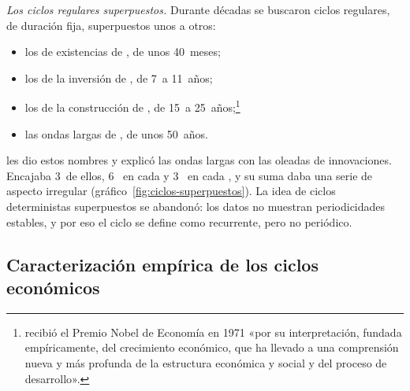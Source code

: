 \documentclass[11pt]{article}
\begin{document}
\begin{anotaciones}
\emph{Los ciclos regulares superpuestos.} Durante décadas se buscaron ciclos regulares, de duración fija, superpuestos unos a otros:
\begin{itemize}
\item los de existencias de \textcite{Kitchin1923Cycles}, de unos 40~meses;
\item los de la inversión de \textcite{Juglar1862Crises}, de 7~a 11~años;
\item los de la construcción de \textcite{Kuznets1930Secular}, de 15~a 25~años;\footnote{ recibió el Premio Nobel de Economía en 1971 «por su interpretación, fundada empíricamente, del crecimiento económico, que ha llevado a una comprensión nueva y más profunda de la estructura económica y social y del proceso de desarrollo»\nocite{Nobel1971Kuznets}.}
\item las ondas largas de \textcite{Kondratieff1935Long}, de unos 50~años.
\end{itemize}
\textcite{Schumpeter1939Business} les dio estos nombres y explicó las ondas largas con las oleadas de innovaciones. Encajaba 3~de ellos, 6~ en cada  y 3~ en cada , y su suma daba una serie de aspecto irregular (gráfico~\ref{fig:ciclos-superpuestos}). La idea de ciclos deterministas superpuestos se abandonó: los datos no muestran periodicidades estables, y por eso el ciclo se define como recurrente, pero no periódico.
\begin{figuracaja}
\caption{Los ciclos regulares superpuestos: las 4~ondas y el esquema de }\label{fig:ciclos-superpuestos}
\end{figuracaja}
\end{anotaciones}

\subsection{Caracterización empírica de los ciclos económicos}\label{sec:medicion}
\end{document}
